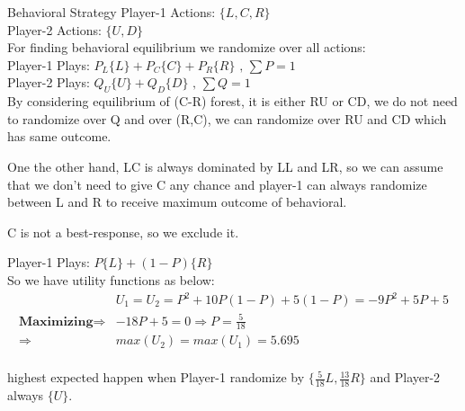 \documentclass[
  course = {{IE579 Game Theory and Multi-Agent Reinforcement Learning}},
  quartile = {{4}},
  assignment = 2,
  name = {{Mohammad Mahdi Rahimi}},
  studentnumber = {{20208244}},
  email = {{mahi@kaist.ac.kr}},
  firstexercise = 1
]{aga-homework}
\begin{document}
\subexercise Behavioral Strategy
Player-1 Actions: $\{L, C, R\}$\\
Player-2 Actions: $\{U, D\}$\\

For finding behavioral equilibrium we randomize over all actions:\\
Player-1 Plays: $P_L\{L\} + P_C\{C\} + P_R\{R\} \text{ ,  } \sum{P} = 1$\\
Player-2 Plays: $Q_U\{U\} + Q_D\{D\} \text{ ,  } \sum{Q} = 1$\\

By considering equilibrium of (C-R) forest, it is either RU or CD, we do not need to randomize over Q and over (R,C), we can randomize over RU and CD which has same outcome.

One the other hand, LC is always dominated by LL and LR, so we can assume that we don't need to give C any chance and player-1 can always randomize between L and R to receive maximum outcome of behavioral.

C is not a best-response, so we exclude it.

Player-1 Plays: $P\{L\} + (1 -P)\{R\}$\\

So we have utility functions as below:
\begin{equation} \label{eq1}
\begin{split}
& U_1 = U_2 = P^2 + 10P(1-P) + 5(1-P) = -9P^2 + 5P + 5 \\
\textbf{Maximizing} \Rightarrow & -18P + 5 = 0 \Rightarrow P = \frac{5}{18}\\
\Rightarrow & max(U_2) = max(U_1) = 5.695
\end{split}
\end{equation}\\
highest expected happen when Player-1 randomize by $\{\frac{5}{18}L, \frac{13}{18}R\}$ and Player-2 always $\{U\}$.
\end{document}
